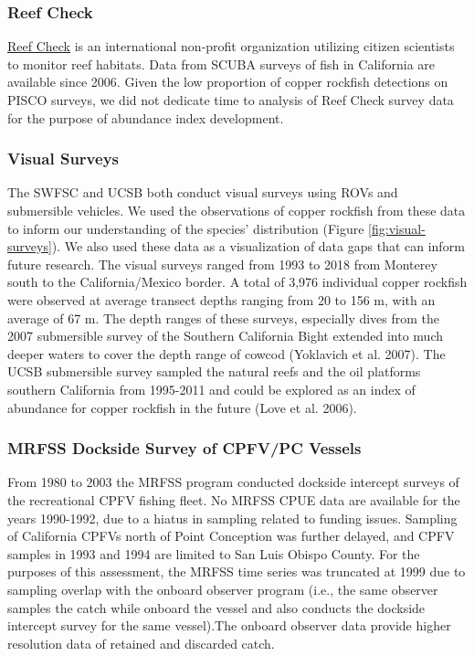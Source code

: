 \documentclass[11pt,
  english,
  letterpaper,
]{article}
\begin{document}
\hypertarget{reef-check}{%
\subsubsection{Reef Check}\label{reef-check}}

\href{https://www.reefcheck.org/}{Reef Check} is an international non-profit organization utilizing citizen scientists to monitor reef habitats. Data from SCUBA surveys of fish in California are available since 2006. Given the low proportion of copper rockfish detections on PISCO surveys, we did not dedicate time to analysis of Reef Check survey data for the purpose of abundance index development.

\hypertarget{visual-surveys}{%
\subsubsection{Visual Surveys}\label{visual-surveys}}

The SWFSC and UCSB both conduct visual surveys using ROVs and submersible vehicles. We used the observations of copper rockfish from these data to inform our understanding of the species' distribution (Figure \ref{fig:visual-surveys}). We also used these data as a visualization of data gaps that can inform future research. The visual surveys ranged from 1993 to 2018 from Monterey south to the California/Mexico border. A total of 3,976 individual copper rockfish were observed at average transect depths ranging from 20 to 156 m, with an average of 67 m. The depth ranges of these surveys, especially dives from the 2007 submersible survey of the Southern California Bight extended into much deeper waters to cover the depth range of cowcod (Yoklavich et al. 2007). The UCSB submersible survey sampled the natural reefs and the oil platforms southern California from 1995-2011 and could be explored as an index of abundance for copper rockfish in the future (Love et al. 2006).

\hypertarget{mrfss-dockside-survey-of-cpfvpc-vessels}{%
\subsubsection{MRFSS Dockside Survey of CPFV/PC Vessels}\label{mrfss-dockside-survey-of-cpfvpc-vessels}}

From 1980 to 2003 the MRFSS program conducted dockside intercept surveys of the recreational CPFV fishing fleet. No MRFSS CPUE data are available for the years 1990-1992, due to a hiatus in sampling related to funding issues. Sampling of California CPFVs north of Point Conception was further delayed, and CPFV samples in 1993 and 1994 are limited to San Luis Obispo County. For the purposes of this assessment, the MRFSS time series was truncated at 1999 due to sampling overlap with the onboard observer program (i.e., the same observer samples the catch while onboard the vessel and also conducts the dockside intercept survey for the same vessel).The onboard observer data provide higher resolution data of retained and discarded catch.
\end{document}

